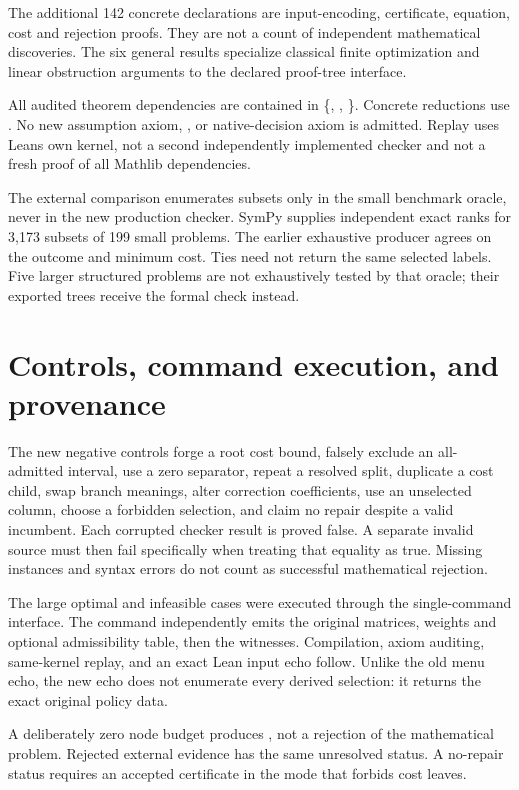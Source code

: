The additional 142 concrete declarations are input-encoding, certificate, equation, cost and rejection proofs. They are not a count of independent mathematical discoveries. The six general results specialize classical finite optimization and linear obstruction arguments to the declared proof-tree interface.

All audited theorem dependencies are contained in \{, , \}. Concrete reductions use . No new assumption axiom, , or native-decision axiom is admitted. Replay uses Lean\textquotesingle s own kernel, not a second independently implemented checker and not a fresh proof of all Mathlib dependencies.

The external comparison enumerates subsets only in the small benchmark oracle, never in the new production checker. SymPy supplies independent exact ranks for 3,173 subsets of 199 small problems. The earlier exhaustive producer agrees on the outcome and minimum cost. Ties need not return the same selected labels. Five larger structured problems are not exhaustively tested by that oracle; their exported trees receive the formal check instead.

\section{Controls, command execution, and provenance}

The new negative controls forge a root cost bound, falsely exclude an all-admitted interval, use a zero separator, repeat a resolved split, duplicate a cost child, swap branch meanings, alter correction coefficients, use an unselected column, choose a forbidden selection, and claim no repair despite a valid incumbent. Each corrupted checker result is proved false. A separate invalid source must then fail specifically when treating that equality as true. Missing instances and syntax errors do not count as successful mathematical rejection.

The large optimal and infeasible cases were executed through the single-command interface. The command independently emits the original matrices, weights and optional admissibility table, then the witnesses. Compilation, axiom auditing, same-kernel replay, and an exact Lean input echo follow. Unlike the old menu echo, the new echo does not enumerate every derived selection: it returns the exact original policy data.

A deliberately zero node budget produces , not a rejection of the mathematical problem. Rejected external evidence has the same unresolved status. A no-repair status requires an accepted certificate in the mode that forbids cost leaves.


